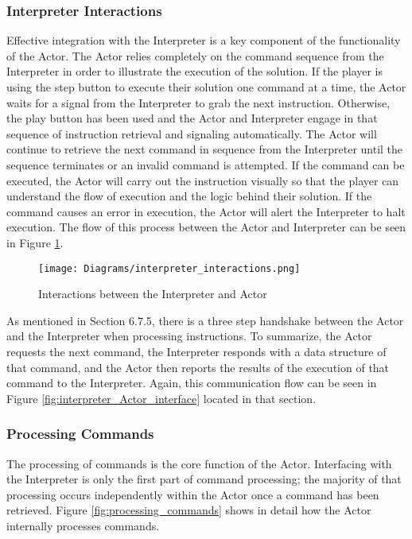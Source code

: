 \subsubsection{Interpreter Interactions}
Effective integration with the Interpreter is a key component of the functionality of the Actor. The Actor relies completely on the command sequence from the Interpreter in order to illustrate the execution of the solution. If the player is using the step button to execute their solution one command at a time, the Actor waits for a signal from the Interpreter to grab the next instruction. Otherwise, the play button has been used and the Actor and Interpreter engage in that sequence of instruction retrieval and signaling automatically. The Actor will continue to retrieve the next command in sequence from the Interpreter until the sequence terminates or an invalid command is attempted. If the command can be executed, the Actor will carry out the instruction visually so that the player can understand the flow of execution and the logic behind their solution. If the command causes an error in execution, the Actor will alert the Interpreter to halt execution. The flow of this process between the Actor and Interpreter can be seen in Figure \ref{fig:interpreter_interactions}.\\

\begin{figure}[!htb]
  \caption{Interactions between the Interpreter and Actor}
  \label{fig:interpreter_interactions}
  \centering
  \texttt{[image: Diagrams/interpreter\_interactions.png]}
\end{figure}

As mentioned in Section 6.7.5, there is a three step handshake between the Actor and the Interpreter when processing instructions. To summarize, the Actor requests the next command, the Interpreter responds with a data structure of that command, and the Actor then reports the results of the execution of that command to the Interpreter. Again, this communication flow can be seen in Figure \ref{fig:interpreter_Actor_interface} located in that section.\\

\subsubsection{Processing Commands}
The processing of commands is the core function of the Actor. Interfacing with the Interpreter is only the first part of command processing; the majority of that processing occurs independently within the Actor once a command has been retrieved. Figure \ref{fig:processing_commands} shows in detail how the Actor internally processes commands.\\

